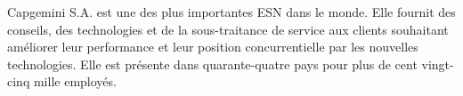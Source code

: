 Capgemini S.A. est une des plus importantes ESN dans le monde. Elle fournit des conseils, des technologies et de la sous-traitance de service aux clients souhaitant améliorer leur performance et leur position concurrentielle par les nouvelles technologies. Elle est présente dans quarante-quatre pays pour plus de cent vingt-cinq mille employés.